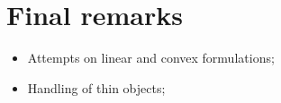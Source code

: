 \documentclass[runningheads]{llncs}
\begin{document}
\section{Final remarks}

\begin{itemize}
    \item{Attempts on linear and convex formulations; }
    \item{Handling of thin objects;  }
\end{itemize}

%
%
%


\end{document}
